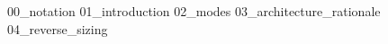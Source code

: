 {00_notation}
\pagebreak
{}
{01_introduction}
{02_modes}
{03_architecture_rationale}
{04_reverse_sizing}